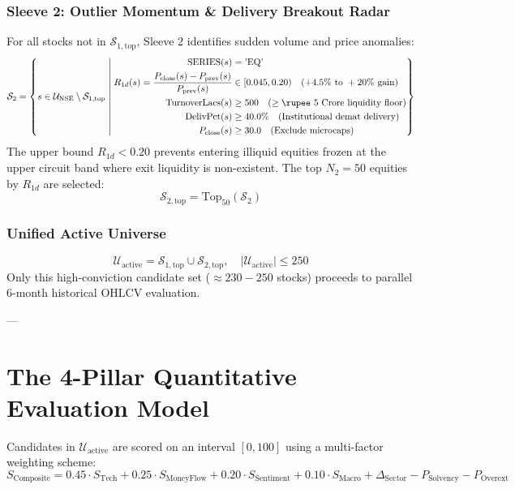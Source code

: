 \documentclass[11pt,a4paper]{article}
\begin{document}
\subsubsection{Sleeve 2: Outlier Momentum \& Delivery Breakout Radar}
For all stocks not in $\mathcal{S}_{1, \text{top}}$, Sleeve 2 identifies sudden volume and price anomalies:
\begin{equation}
\mathcal{S}_2 = \left\{ s \in \mathcal{U}_{\text{NSE}} \setminus \mathcal{S}_{1, \text{top}} \;\middle|\;
\begin{aligned}
\text{SERIES}(s) &= \text{'EQ'} \\
R_{1d}(s) = \frac{P_{\text{close}}(s) - P_{\text{prev}}(s)}{P_{\text{prev}}(s)} &\in [0.045, 0.20) \quad (+4.5\% \text{ to } +20\% \text{ gain}) \\
\text{TurnoverLacs}(s) &\ge 500 \quad (\ge \text{\rupee 5 Crore liquidity floor}) \\
\text{DelivPct}(s) &\ge 40.0\% \quad (\text{Institutional demat delivery}) \\
P_{\text{close}}(s) &\ge 30.0 \quad (\text{Exclude microcaps})
\end{aligned}
\right\}
\end{equation}
The upper bound $R_{1d} < 0.20$ prevents entering illiquid equities frozen at the upper circuit band where exit liquidity is non-existent. The top $N_2 = 50$ equities by $R_{1d}$ are selected:
\begin{equation}
\mathcal{S}_{2, \text{top}} = \text{Top}_{50} \left( \mathcal{S}_2 \right)
\end{equation}

\subsubsection{Unified Active Universe}
\begin{equation}
\mathcal{U}_{\text{active}} = \mathcal{S}_{1, \text{top}} \cup \mathcal{S}_{2, \text{top}}, \quad |\mathcal{U}_{\text{active}}| \le 250
\end{equation}
Only this high-conviction candidate set ($\approx 230 - 250$ stocks) proceeds to parallel 6-month historical OHLCV evaluation.

---

\section{The 4-Pillar Quantitative Evaluation Model}

Candidates in $\mathcal{U}_{\text{active}}$ are scored on an interval $[0, 100]$ using a multi-factor weighting scheme:
\begin{equation}
S_{\text{Composite}} = 0.45 \cdot S_{\text{Tech}} + 0.25 \cdot S_{\text{MoneyFlow}} + 0.20 \cdot S_{\text{Sentiment}} + 0.10 \cdot S_{\text{Macro}} + \Delta_{\text{Sector}} - P_{\text{Solvency}} - P_{\text{Overext}}
\end{equation}
\end{document}
